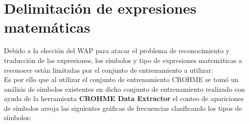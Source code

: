 \newpage
\section{Delimitación de expresiones matemáticas}
\label{sec:del_exp}
Debido a la elección del WAP \cite{chino} para atacar el problema de reconocimiento y traducción de las expresiones, los símbolos y tipo de expresiones matemáticas a reconocer están limitadas por el conjunto de entrenamiento a utilizar:
\\
Es por ello que al utilizar el conjunto de entrenamiento CROHME \cite{CROHME}
se tomó un análisis de símbolos existentes en dicho conjunto de entrenamiento realizado con ayuda de la herramienta \textbf{CROHME Data Extractor} \cite{EXTRACTOR} el conteo de apariciones de símbolos arroja las siguientes gráficas de frecuencias clasificando los tipos de símbolos:\\

